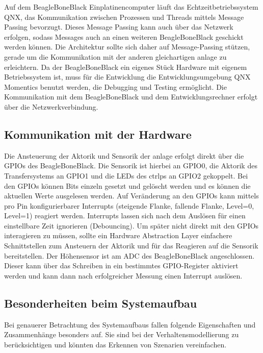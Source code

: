 Auf dem BeagleBoneBlack Einplatinencomputer läuft das Echtzeitbetriebssystem QNX, das Kommunikation
zwischen Prozessen und Threads mittels Message Passing bevorzugt.
Dieses Message Passing kann auch über das Netzwerk erfolgen, sodass Messages auch an
einen weiteren BeagleBoneBlack geschickt werden können.
Die Architektur sollte sich daher auf Message-Passing stützen, gerade um die Kommunikation mit der
anderen gleichartigen \gls{anlage} zu erleichtern.
Da der BeagleBoneBlack ein eigenes Stück Hardware mit eigenem Betriebssystem ist, muss für die
Entwicklung die Entwicklungsumgebung QNX Momentics benutzt werden, die Debugging und Testing ermöglicht.
Die Kommunikation mit dem BeagleBoneBlack und dem Entwicklungsrechner erfolgt über die Netzwerkverbindung.

\subsection{Kommunikation mit der Hardware}

Die Ansteuerung der Aktorik und Sensorik der \gls{anlage} erfolgt direkt über die GPIOs des BeagleBoneBlack.
Die Sensorik ist hierbei an GPIO0, die Aktorik des Transfersystems an GPIO1 und die LEDs des \gls{ctrlp}s an GPIO2
gekoppelt.
Bei den GPIOs können Bits einzeln gesetzt und gelöscht werden und es können die aktuellen Werte ausgelesen werden.
Auf Veränderung an den GPIOs kann mittels pro Pin konfigurierbarer Interrupts (steigende Flanke, fallende Flanke,
Level=0, Level=1) reagiert werden.
Interrupts lassen sich nach dem Auslösen für einen einstellbare Zeit ignorieren (Debouncing).
Um später nicht direkt mit den GPIOs interagieren zu müssen, sollte ein Hardware Abstraction Layer
einfachere Schnittstellen zum Ansteuern der Aktorik und für das Reagieren auf die Sensorik bereitstellen.
Der Höhensensor ist am ADC des BeagleBoneBlack angeschlossen. Dieser kann über das Schreiben in ein
bestimmtes GPIO-Register aktiviert werden und kann dann nach erfolgreicher Messung einen Interrupt auslösen.

\subsection{Besonderheiten beim Systemaufbau}

Bei genauerer Betrachtung des Systemaufbaus fallen folgende Eigenschaften und Zusammenhänge besonders auf.
Sie sind bei der Verhaltensmodellierung zu berücksichtigen und könnten das Erkennen von Szenarien vereinfachen.

